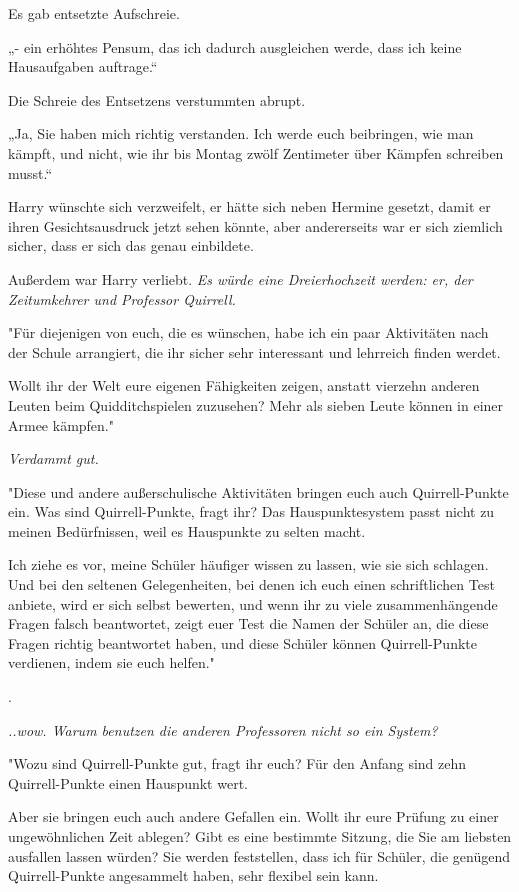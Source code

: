 {Es gab entsetzte Aufschreie.

„- ein erhöhtes Pensum, das ich dadurch ausgleichen werde, dass ich keine Hausaufgaben auftrage.“

Die Schreie des Entsetzens verstummten abrupt.

„Ja, Sie haben mich richtig verstanden. Ich werde euch beibringen, wie man kämpft, und nicht, wie ihr bis Montag zwölf Zentimeter über Kämpfen schreiben musst.“

Harry wünschte sich verzweifelt, er hätte sich neben Hermine gesetzt, damit er ihren Gesichtsausdruck jetzt sehen könnte, aber andererseits war er sich ziemlich sicher, dass er sich das genau einbildete.

Außerdem war Harry verliebt. \emph{Es würde eine Dreierhochzeit werden: er, der Zeitumkehrer und Professor Quirrell.}

"Für diejenigen von euch, die es wünschen, habe ich ein paar Aktivitäten nach der Schule arrangiert, die ihr sicher sehr interessant und lehrreich finden werdet.

Wollt ihr der Welt eure eigenen Fähigkeiten zeigen, anstatt vierzehn anderen Leuten beim Quidditchspielen zuzusehen? Mehr als sieben Leute können in einer Armee kämpfen."

\emph{\hfill\break Verdammt gut.}

"Diese und andere außerschulische Aktivitäten bringen euch auch Quirrell-Punkte ein. Was sind Quirrell-Punkte, fragt ihr? Das Hauspunktesystem passt nicht zu meinen Bedürfnissen, weil es Hauspunkte zu selten macht.

Ich ziehe es vor, meine Schüler häufiger wissen zu lassen, wie sie sich schlagen. Und bei den seltenen Gelegenheiten, bei denen ich euch einen schriftlichen Test anbiete, wird er sich selbst bewerten, und wenn ihr zu viele zusammenhängende Fragen falsch beantwortet, zeigt euer Test die Namen der Schüler an, die diese Fragen richtig beantwortet haben, und diese Schüler können Quirrell-Punkte verdienen, indem sie euch helfen."

.

\emph{..wow. Warum benutzen die anderen Professoren nicht so ein System?}

"Wozu sind Quirrell-Punkte gut, fragt ihr euch? Für den Anfang sind zehn Quirrell-Punkte einen Hauspunkt wert.

Aber sie bringen euch auch andere Gefallen ein. Wollt ihr eure Prüfung zu einer ungewöhnlichen Zeit ablegen? Gibt es eine bestimmte Sitzung, die Sie am liebsten ausfallen lassen würden? Sie werden feststellen, dass ich für Schüler, die genügend Quirrell-Punkte angesammelt haben, sehr flexibel sein kann.

}
